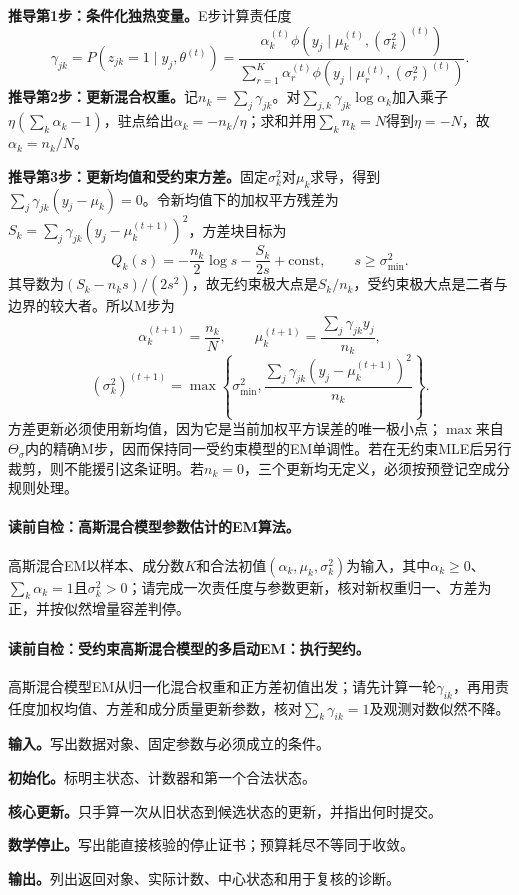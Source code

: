 \textbf{推导第1步：条件化独热变量。}E步计算责任度
\[
\gamma_{jk}=P(z_{jk}=1\mid y_j,\theta^{(t)})
=\frac{\alpha_k^{(t)}\phi(y_j\mid\mu_k^{(t)},(\sigma_k^2)^{(t)})}
{\sum_{r=1}^{K}\alpha_r^{(t)}\phi(y_j\mid\mu_r^{(t)},(\sigma_r^2)^{(t)})}.
\]
\textbf{推导第2步：更新混合权重。}记$n_k=\sum_j\gamma_{jk}$。对$\sum_{j,k}\gamma_{jk}\log\alpha_k$加入乘子$\eta(\sum_k\alpha_k-1)$，驻点给出$\alpha_k=-n_k/\eta$；求和并用$\sum_kn_k=N$得到$\eta=-N$，故$\alpha_k=n_k/N$。\par
\textbf{推导第3步：更新均值和受约束方差。}固定$\sigma_k^2$对$\mu_k$求导，得到$\sum_j\gamma_{jk}(y_j-\mu_k)=0$。令新均值下的加权平方残差为$S_k=\sum_j\gamma_{jk}(y_j-\mu_k^{(t+1)})^2$，方差块目标为
\[
Q_k(s)=-\frac{n_k}{2}\log s-\frac{S_k}{2s}+\mathrm{const},
\qquad s\geq\sigma_{\min}^2.
\]
其导数为$(S_k-n_ks)/(2s^2)$，故无约束极大点是$S_k/n_k$，受约束极大点是二者与边界的较大者。所以M步为
\[
\alpha_k^{(t+1)}=\frac{n_k}{N},\qquad
\mu_k^{(t+1)}=\frac{\sum_j\gamma_{jk}y_j}{n_k},
\]
\[
(\sigma_k^2)^{(t+1)}=
\max\left\{\sigma_{\min}^2,
\frac{\sum_j\gamma_{jk}(y_j-\mu_k^{(t+1)})^2}{n_k}\right\}.
\]
方差更新必须使用新均值，因为它是当前加权平方误差的唯一极小点；$\max$来自$\Theta_\sigma$内的精确M步，因而保持同一受约束模型的EM单调性。若在无约束MLE后另行裁剪，则不能援引这条证明。若$n_k=0$，三个更新均无定义，必须按预登记空成分规则处理。

\paragraph{读前自检：高斯混合模型参数估计的EM算法。}高斯混合EM以样本、成分数$K$和合法初值$(\alpha_k,\mu_k,\sigma_k^2)$为输入，其中$\alpha_k\ge0$、$\sum_k\alpha_k=1$且$\sigma_k^2>0$；请完成一次责任度与参数更新，核对新权重归一、方差为正，并按似然增量容差判停。\par

\paragraph{读前自检：受约束高斯混合模型的多启动EM：执行契约。}高斯混合模型EM从归一化混合权重和正方差初值出发；请先计算一轮$\gamma_{ik}$，再用责任度加权均值、方差和成分质量更新参数，核对$\sum_k\gamma_{ik}=1$及观测对数似然不降。\par
\begin{keypointbox}[title={受约束高斯混合模型的多启动EM：五步阅读}]
\textbf{输入。}写出数据对象、固定参数与必须成立的条件。\par
\textbf{初始化。}标明主状态、计数器和第一个合法状态。\par
\textbf{核心更新。}只手算一次从旧状态到候选状态的更新，并指出何时提交。\par
\textbf{数学停止。}写出能直接核验的停止证书；预算耗尽不等同于收敛。\par
\textbf{输出。}列出返回对象、实际计数、中心状态和用于复核的诊断。
\end{keypointbox}

